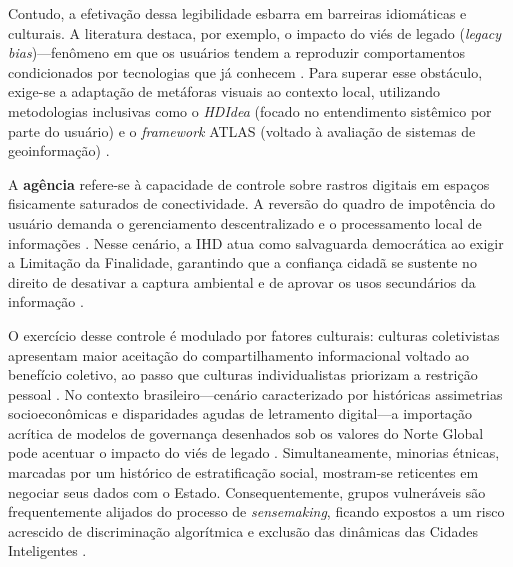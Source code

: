 \documentclass[12pt]{article}
\begin{document}
    Contudo, a efetivação dessa legibilidade esbarra em barreiras idiomáticas e culturais. A literatura destaca, por exemplo, o impacto do viés de legado (\textit{legacy bias})---fenômeno em que os usuários tendem a reproduzir comportamentos condicionados por tecnologias que já conhecem \cite{Friedman2024}. Para superar esse obstáculo, exige-se a adaptação de metáforas visuais ao contexto local, utilizando metodologias inclusivas como o \textit{HDIdea} (focado no entendimento sistêmico por parte do usuário) \cite{Strey2019Human} e o \textit{framework} ATLAS (voltado à avaliação de sistemas de geoinformação) \cite{Capeleti2024Human}.

    A \textbf{agência} refere-se à capacidade de controle sobre rastros digitais em espaços fisicamente saturados de conectividade. A reversão do quadro de impotência do usuário demanda o gerenciamento descentralizado e o processamento local de informações \cite{Sailaja2021, Crabtree2016}. Nesse cenário, a IHD atua como salvaguarda democrática ao exigir a Limitação da Finalidade, garantindo que a confiança cidadã se sustente no direito de desativar a captura ambiental e de aprovar os usos secundários da informação \cite{Mashhadi2014}.

    O exercício desse controle é modulado por fatores culturais: culturas coletivistas apresentam maior aceitação do compartilhamento informacional voltado ao benefício coletivo, ao passo que culturas individualistas priorizam a restrição pessoal \cite{Locoro2020}. No contexto brasileiro---cenário caracterizado por históricas assimetrias socioeconômicas e disparidades agudas de letramento digital---a importação acrítica de modelos de governança desenhados sob os valores do Norte Global pode acentuar o impacto do viés de legado \cite{Friedman2024}. Simultaneamente, minorias étnicas, marcadas por um histórico de estratificação social, mostram-se reticentes em negociar seus dados com o Estado. Consequentemente, grupos vulneráveis são frequentemente alijados do processo de \textit{sensemaking}, ficando expostos a um risco acrescido de discriminação algorítmica e exclusão das dinâmicas das Cidades Inteligentes \cite{malgieri2020vulnerable, Yuan20243615}.
\end{document}
